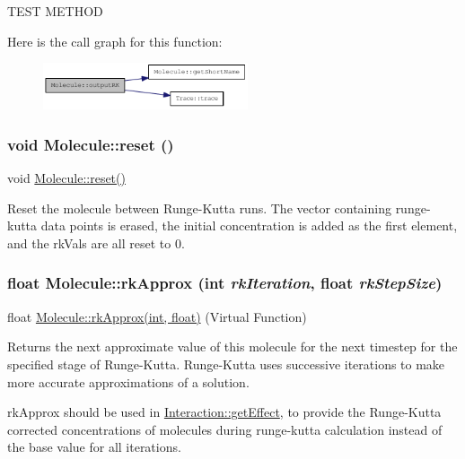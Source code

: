 TEST METHOD 

Here is the call graph for this function:\nopagebreak
\begin{figure}[H]
\begin{center}
\leavevmode
\includegraphics[width=171pt]{classMolecule_ac6c78f4a49e270815d7e7dba311b7e14_cgraph}
\end{center}
\end{figure}
\hypertarget{classMolecule_ab073ddc977c06fe8f70b2c5108eead8c}{
\subsubsection[{reset}]{\setlength{\rightskip}{0pt plus 5cm}void Molecule::reset ()}}
\label{classMolecule_ab073ddc977c06fe8f70b2c5108eead8c}
void \hyperlink{classMolecule_ab073ddc977c06fe8f70b2c5108eead8c}{Molecule::reset()}

Reset the molecule between Runge-\/Kutta runs. The vector containing runge-\/kutta data points is erased, the initial concentration is added as the first element, and the rkVals are all reset to 0. \hypertarget{classMolecule_adabb58a65655a7f55dae0d82b65d04ba}{
\subsubsection[{rkApprox}]{\setlength{\rightskip}{0pt plus 5cm}float Molecule::rkApprox (int {\em rkIteration}, \/  float {\em rkStepSize})}}
\label{classMolecule_adabb58a65655a7f55dae0d82b65d04ba}
float \hyperlink{classMolecule_adabb58a65655a7f55dae0d82b65d04ba}{Molecule::rkApprox(int, float)} (Virtual Function)

Returns the next approximate value of this molecule for the next timestep for the specified stage of Runge-\/Kutta. Runge-\/Kutta uses successive iterations to make more accurate approximations of a solution.

rkApprox should be used in \hyperlink{classInteraction_a6328831e714adf9c8177f6052d2e017f}{Interaction::getEffect}, to provide the Runge-\/Kutta corrected concentrations of molecules during runge-\/kutta calculation instead of the base value for all iterations.


